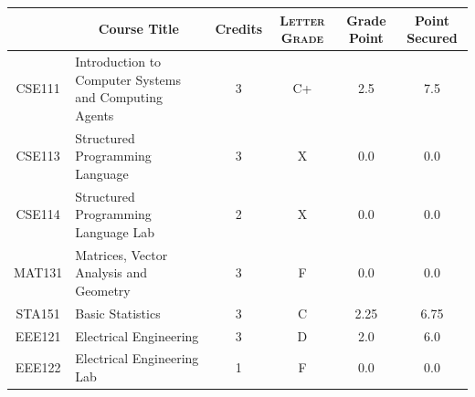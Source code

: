 \documentclass[11pt]{article}
\newcommand*{\numtwo}[1]{\pgfmathprintnumber[
                    fixed, precision=2, fixed zerofill=true]{#1}}
\begin{document}
                \begin{center}
                    \renewcommand{\arraystretch}{1.08}
                    
                \begin{tabular}{|c|l|c|>{\scshape}c|c|c|}
                \hline  \rule[-1ex]{0pt}{3.5ex} {\centering{\bf Course Code}} &  \multicolumn{1}{c|}{\textbf{Course Title}}  & {\bf Credits} & {\bf Letter Grade} & {\bf Grade Point} & {\bf Point Secured}  \\ 
                \hline   CSE111 &  Introduction to Computer Systems and Computing Agents		 & 3 & C+ & 2.5 & 7.5 \\ %
                \hline   CSE113 &  Structured Programming Language		 & 3 & X & 0.0 & 0.0 \\ %
                \hline   CSE114 &  Structured Programming Language Lab		 & 2 & X & 0.0 & 0.0 \\ %
                \hline   MAT131 &  Matrices, Vector Analysis and Geometry		 & 3 & F & 0.0 & 0.0 \\ %
                \hline   STA151 &  Basic Statistics		 & 3 & C & 2.25 & 6.75 \\ %
                \hline   EEE121 &  Electrical Engineering		 & 3 & D & 2.0 & 6.0 \\ %
                \hline   EEE122 &  Electrical Engineering Lab		 & 1 & F & 0.0 & 0.0 \\ %

\hline                %
                \end{tabular}
                \end{center}
                \renewcommand{\arraystretch}{1.03}
\end{document}

